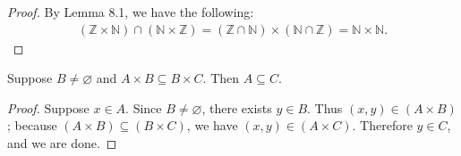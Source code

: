\documentclass{exam}
\begin{document}
\begin{proof}
    By Lemma 8.1, we have the following:
    \begin{align*}
        (\mathbb Z\times\mathbb N)\cap(\mathbb N\times \mathbb Z) = (\mathbb Z\cap\mathbb N)\times(\mathbb N\cap \mathbb Z) = \mathbb N\times\mathbb N.
    \end{align*}
\end{proof}

\begin{proposition}{8.31}
    Suppose $B\neq\varnothing$ and $A\times B\subseteq B\times C$. Then $A\subseteq C$.
\end{proposition}

\begin{proof}
    Suppose $x\in A$. Since $B\neq\varnothing$, there exists $y\in B$. Thus $(x, y) \in (A\times B)$; because $(A\times B)\subseteq (B\times C)$, we have $(x, y) \in (A\times C)$. Therefore $y\in C$, and we are done.
\end{proof}
\end{document}
